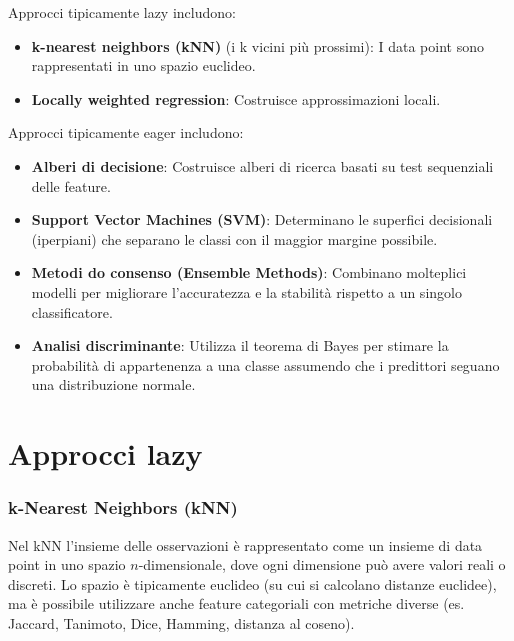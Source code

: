 Approcci tipicamente lazy includono:
\begin{itemize}
    \item \textbf{k-nearest neighbors (kNN)} (i k vicini più prossimi): I
    data point sono rappresentati in uno spazio euclideo.
    \item \textbf{Locally weighted regression}: Costruisce approssimazioni
    locali.
\end{itemize}
Approcci tipicamente eager includono:
\begin{itemize}
    \item \textbf{Alberi di decisione}: Costruisce alberi di ricerca
    basati su test sequenziali delle feature.
    \item \textbf{Support Vector Machines (SVM)}: Determinano le superfici
    decisionali (iperpiani) che separano le classi con il maggior margine
    possibile.
    \item \textbf{Metodi do consenso (Ensemble Methods)}: Combinano molteplici
    modelli per migliorare l'accuratezza e la stabilità rispetto a un singolo
    classificatore.
    \item \textbf{Analisi discriminante}: Utilizza il teorema di Bayes per
    stimare la probabilità di appartenenza a una classe assumendo che i
    predittori seguano una distribuzione normale.
\end{itemize}

\section{Approcci lazy}

\subsubsection{k-Nearest Neighbors (kNN)}

Nel kNN l'insieme delle osservazioni è rappresentato come un insieme di data
point in uno spazio $n$-dimensionale, dove ogni dimensione può avere valori
reali o discreti.
Lo spazio è tipicamente euclideo (su cui si calcolano distanze euclidee),
ma è possibile utilizzare anche feature categoriali con metriche diverse
(es. Jaccard, Tanimoto, Dice, Hamming, distanza al coseno).


